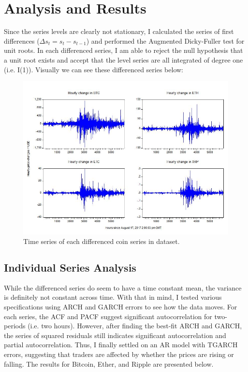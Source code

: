 \documentclass{article}
\begin{document}
	\section{Analysis and Results}
	
	Since the series levels are clearly not stationary, I calculated the series of first differences ($\Delta s_t = s_t - s_{t-1}$) and performed the Augmented Dicky-Fuller test for unit roots. In each differenced series, I am able to reject the null hypothesis that a unit root exists and accept that the level series are all integrated of degree one (i.e. I(1)). Visually we can see these differenced series below:
	
	\begin{figure}[H]
		\centering
		\includegraphics[width = .75\textwidth]{AllCoinsDifferenced_graph.jpg}
		\caption{Time series of each differenced coin series in dataset.}
	\end{figure}
	
	\subsection{Individual Series Analysis}
	While the differenced series do seem to have a time constant mean, the variance is definitely not constant across time. With that in mind, I tested various specifications using ARCH and GARCH errors to see how the data moves. For each series, the ACF and PACF suggest significant autocorrelation for two-periods (i.e. two hours). However, after finding the best-fit ARCH and GARCH, the series of squared residuals still indicates significant autocorrelation and partial autocorrelation. Thus, I finally settled on an AR model with TGARCH errors, suggesting that traders are affected by whether the prices are rising or falling. The results for Bitcoin, Ether, and Ripple are presented below. 
	
\end{document}

